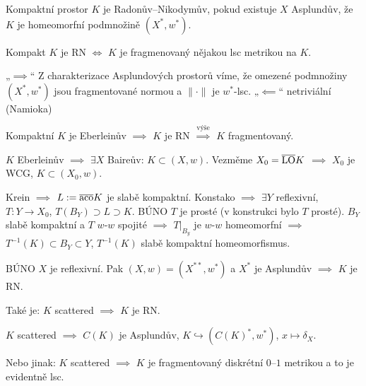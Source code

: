 \documentclass[12pt]{article}					%
\begin{document}
\begin{definice}
	Kompaktní prostor $K$ je Radonův–Nikodymův, pokud existuje $X$ Asplundův, že $K$ je homeomorfní podmnožině $(X^*, w^*)$.
\end{definice}

\begin{poznamka}
	Kompakt $K$ je RN $\Leftrightarrow$ $K$ je fragmenovaný nějakou lsc metrikou na $K$.

	\begin{dukazin}
		„$\implies$“ Z charakterizace Asplundových prostorů víme, že omezené podmnožiny $(X^*, w^*)$ jsou fragmentované normou a $\|·\|$ je $w^*$-lsc. „$\impliedby$“ netriviální (Namioka)
	\end{dukazin}

	Kompaktní $K$ je Eberleinův $\implies$ $K$ je RN $\overset{\text{výše}}\implies$ $K$ fragmentovaný.

	\begin{dukazin}
		$K$ Eberleinův $\implies$ $\exists X$ Baireův: $K \subset (X, w)$. Vezměme $X_0 = \overline{\operatorname{LO}} K$ $\implies$ $X_0$ je WCG, $K \subset (X_0, w)$.

		Krein $\implies$ $L := \overline{\operatorname{aco}} K$ je slabě kompaktní. Konstako $\implies$ $\exists Y$ reflexivní, $T: Y \rightarrow X_0$, $T(B_Y) \supset L \supset K$. BÚNO $T$ je prosté (v konstrukci bylo $T$ prosté). $B_Y$ slabě kompaktní a $T$ $w$-$w$ spojité $\implies$ $T|_{B_y}$ je $w$-$w$ homeomorfní $\implies$ $T^{-1}(K) \subset B_Y \subset Y$, $T^{-1}(K)$ slabě kompaktní homeomorfismus.

		BÚNO $X$ je reflexivní. Pak $(X, w) = (X^{**}, w^*)$ a $X^*$ je Asplundův $\implies$ $K$ je RN.
	\end{dukazin}
	
	Také je: $K$ scattered $\implies$ $K$ je RN.

	\begin{dukazin}
		$K$ scattered $\implies$ $C(K)$ je Asplundův, $K \hookrightarrow (C(K)^*, w^*)$, $x \mapsto δ_X$.

		Nebo jinak: $K$ scattered $\implies$ $K$ je fragmentovaný diskrétní $0–1$ metrikou a to je evidentně lsc.
	\end{dukazin}
\end{poznamka}
\end{document}
